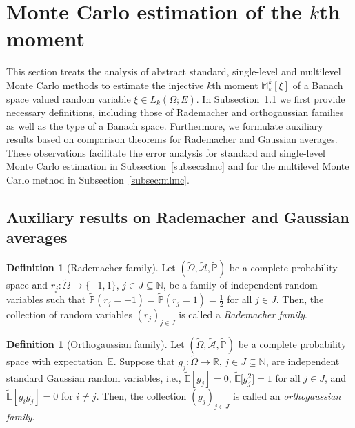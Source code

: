 \documentclass[reqno]{amsart}
\numberwithin{equation}{section}
\newcommand{\bbE}{\mathbb{E}}
\newcommand{\bbM}{\mathbb{M}}
\newcommand{\bbN}{\mathbb{N}}
\newcommand{\bbP}{\mathbb{P}}
\newcommand{\bbR}{\mathbb{R}}
\newcommand{\cA}{\mathcal{A}}
\newcommand{\Omegat}{\widetilde{\Omega}}
\newcommand{\cAt}{\widetilde{\cA}}
\newcommand{\bbPt}{\widetilde{\bbP}}
\newcommand{\bbEt}{\widetilde{\bbE}}
\newcommand{\Mk}{\bbM^k_\varepsilon}
\newcommand{\from}{\colon}
\theoremstyle{remark}
\theoremstyle{definition}
\newtheorem{definition}[lemma]{Definition}
\begin{document}
\section{Monte Carlo estimation of the \texorpdfstring{$k$th}{kth} moment} 
\label{section:abstract}   

This section treats 
the analysis of abstract standard, single-level and 
multilevel Monte Carlo 
methods to estimate the injective $k$th moment $\Mk[\xi]$ 
of a Banach space valued random variable $\xi\in L_k(\Omega;E)$.  
In Subsection~\ref{subsec:auxiliary} 
we first provide necessary definitions, 
including those of 
Rademacher and orthogaussian families 
as well as the type of a Banach space.   
Furthermore, we formulate auxiliary 
results based on comparison theorems 
for Rademacher and Gaussian averages.  
These observations facilitate 
the error analysis for  
standard and single-level Monte Carlo estimation  
in Subsection~\ref{subsec:slmc} 
and for the multilevel Monte Carlo method 
in Subsection~\ref{subsec:mlmc}. 

\subsection{Auxiliary results on Rademacher and Gaussian averages} 
\label{subsec:auxiliary} 

\begin{definition}[Rademacher family]\label{def:rade-family} 
	Let $(\Omegat,\cAt,\bbPt)$ 
	be a complete probability space and 
	$r_j \from \Omegat\to\{-1,1\}$, $j\in J\subseteq\bbN$, 
	be a family of independent random variables such that  
	$\bbPt(r_j = -1)=\bbPt(r_j = 1)=\tfrac{1}{2}$ for all $j\in J$. 
	Then, the collection of random variables 
	$(r_j)_{j\in J}$ is called a \emph{Rademacher family}.
\end{definition} 

\begin{definition}[Orthogaussian family]\label{def:orthogaussian} 
	Let $(\Omegat,\cAt,\bbPt)$ 
	be a complete probability space 
	with expectation~$\bbEt$. 
	Suppose that 
	$g_j \from \Omegat\to\bbR$, $j\in J\subseteq\bbN$, 
	are independent standard Gaussian random variables, 
	i.e., $\bbEt[g_j] = 0$, $\bbEt\bigl[g_j^2 \bigr] = 1$ 
	for all $j\in J$, 
	and $\bbEt[g_i g_j] = 0$ for $i\neq j$.  
	Then, the collection $(g_j)_{j\in J}$ is called an 
	\emph{orthogaussian family}. 
\end{definition} 
\end{document}
